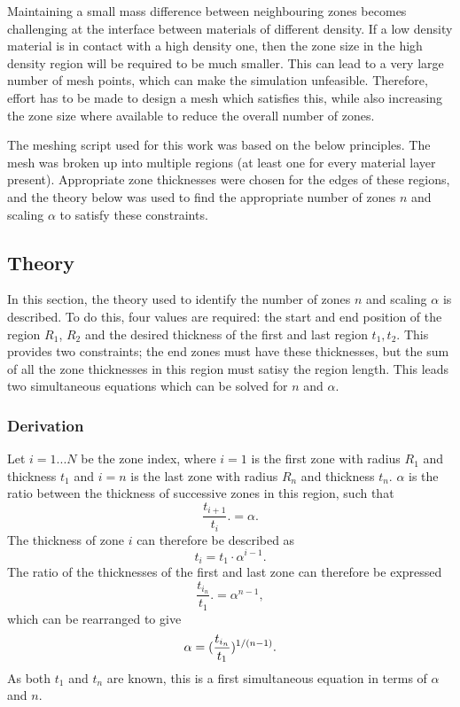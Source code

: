 Maintaining a small mass difference between neighbouring zones becomes challenging at the interface between materials of different density. If a low density material is in contact with a high density one, then the zone size in the high density region will be required to be much smaller. This can lead to a very large number of mesh points, which can make the simulation unfeasible. Therefore, effort has to be made to design a mesh which satisfies this, while also increasing the zone size where available to reduce the overall number of zones.

The meshing script used for this work was based on the below principles. The mesh was broken up into multiple regions (at least one for every material layer present). Appropriate zone thicknesses were chosen for the edges of these regions, and the theory below was used to find the appropriate number of zones $n$ and scaling $\alpha$ to satisfy these constraints.

\subsection{Theory}

In this section, the theory used to identify the number of zones $n$ and scaling $\alpha$ is described. To do this, four values are required: the start and end position of the region $R_1$, $R_2$ and the desired thickness of the first and last region $t_1, t_2$. This provides two constraints; the end zones must have these thicknesses, but the sum of all the zone thicknesses in this region must satisy the region length. This leads two simultaneous equations which can be solved for $n$ and $\alpha$.

\subsubsection{Derivation}
Let $i = 1...N$ be the zone index, where $i=1$ is the first zone with radius $R_1$ and thickness $t_1$ and $i=n$ is the last zone with radius $R_n$ and thickness $t_n$. $\alpha$ is the ratio between the thickness of successive zones in this region, such that 
\begin{equation}{\frac{t_{i+1}}{{t_i}}. = \alpha.}\end{equation}
The thickness of zone $i$ can therefore be described as
\begin{equation}{t_i = t_1 \cdot \alpha^{i-1}.}\end{equation}
The ratio of the thicknesses of the first and last zone can therefore be expressed 
\begin{equation}{\frac{t_{i_n}}{{t_1}}. = \alpha^{n-1},}\end{equation}
which can be rearranged to give
\begin{equation}{\label{eqn: SimEqn1} \alpha = ( \frac{t_{i_n}}{{t_1}} )^{1/(n-1)}.}\end{equation}
As both $t_1$ and $t_n$ are known, this is a first simultaneous equation in terms of $\alpha$ and $n$.

